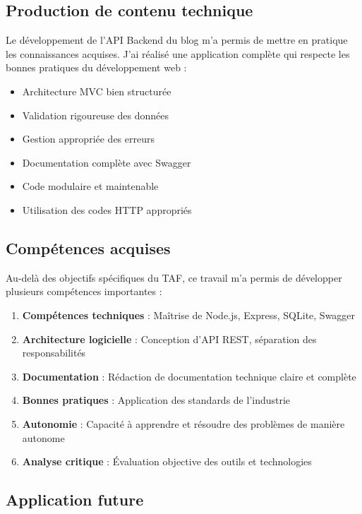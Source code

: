 \documentclass[12pt,a4paper]{article}
\begin{document}
\subsection{Production de contenu technique}

Le développement de l'API Backend du blog m'a permis de mettre en pratique les connaissances acquises. J'ai réalisé une application complète qui respecte les bonnes pratiques du développement web :
\begin{itemize}
    \item Architecture MVC bien structurée
    \item Validation rigoureuse des données
    \item Gestion appropriée des erreurs
    \item Documentation complète avec Swagger
    \item Code modulaire et maintenable
    \item Utilisation des codes HTTP appropriés
\end{itemize}

\subsection{Compétences acquises}

Au-delà des objectifs spécifiques du TAF, ce travail m'a permis de développer plusieurs compétences importantes :

\begin{enumerate}
    \item \textbf{Compétences techniques} : Maîtrise de Node.js, Express, SQLite, Swagger
    \item \textbf{Architecture logicielle} : Conception d'API REST, séparation des responsabilités
    \item \textbf{Documentation} : Rédaction de documentation technique claire et complète
    \item \textbf{Bonnes pratiques} : Application des standards de l'industrie
    \item \textbf{Autonomie} : Capacité à apprendre et résoudre des problèmes de manière autonome
    \item \textbf{Analyse critique} : Évaluation objective des outils et technologies
\end{enumerate}

\subsection{Application future}
\end{document}
